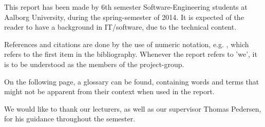 This report has been made by 6th semester Software-Engineering students at Aalborg University, during the spring-semester of 2014.
It is expected of the reader to have a background in IT/software, due to the technical content.

References and citations are done by the use of numeric notation, e.g. \cite{oldcars}, which refers to the first item in the bibliography.
Whenever the report refers to 'we', it is to be understood as the members of the project-group.

On the following page, a glossary can be found, containing words and terms that might not be apparent from their context when used in the report.

We would like to thank our lecturers, as well as our supervisor Thomas Pedersen, for his guidance throughout the semester.